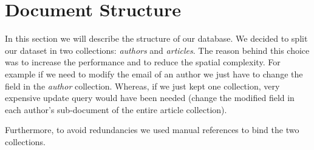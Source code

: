\documentclass{Configuration_Files/PoliMi3i_thesis}
\begin{document}
\chapter{Document Structure}
\label{ch:document_structure}
In this section we will describe the structure of our database. We decided to split our dataset in two collections:
\emph{authors} and \emph{articles}. The reason behind this choice was to increase the performance and to reduce the
spatial complexity. For example if we need to modify the email of an author we just have to change the field in the
\emph{author} collection. Whereas, if we just kept one collection, very expensive update query would have been needed
(change the modified field in each author's sub-document of the entire article collection).

Furthermore, to avoid redundancies we used manual references to bind the two collections.
\end{document}
